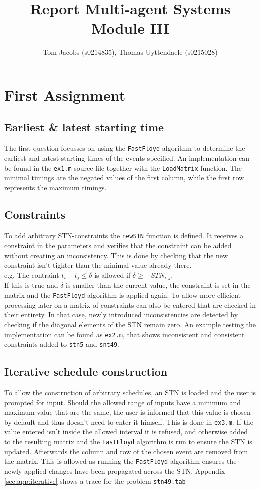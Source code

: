 \documentclass[10pt,a4paper]{article}
\title{Report Multi-agent Systems Module III}
\author{Tom Jacobs (s0214835), Thomas Uyttendaele (s0215028)}
\begin{document}
\maketitle
\tableofcontents

\section{First Assignment}
\subsection{Earliest \& latest starting time}
The first question focusses on using the \texttt{FastFloyd} algorithm to determine the earliest and latest starting times of the events specified. An implementation can be found in the \texttt{ex1.m} source file together with the \texttt{LoadMatrix} function. The minimal timings are the negated values of the first column, while the first row represents the maximum timings.

\subsection{Constraints}
\label{sec:constraints}
To add arbitrary STN-constraints the \texttt{newSTN} function is defined. It receives a constraint in the parameters and verifies that the constraint can be added without creating an inconsistency. This is done by checking that the new constraint isn't tighter than the minimal value already there. \\
e.g. The contraint $t_i - t_j \leq \delta$ is allowed if $\delta \geq -STN_{i,j}$.
\\If this is true and $\delta$ is smaller than the current value, the constraint is set in the matrix and the \texttt{FastFloyd} algorithm is applied again. To allow more efficient processing later on a matrix of constraints can also be entered that are checked in their entirety. In that case, newly introduced inconsistencies are detected by checking if the diagonal elements of the STN remain zero. An example testing the implementation can be found as \texttt{ex2.m}, that shows inconsistent and consistent constraints added to \texttt{stn5} and \texttt{snt49}.

\subsection{Iterative schedule construction}
\label{sec:iterative}
To allow the construction of arbitrary schedules, an STN is loaded and the user is prompted for input. Should the allowed range of inputs have a minimum and maximum value that are the same, the user is informed that this value is chosen by default and thus doesn't need to enter it himself. This is done in \texttt{ex3.m}. If the value entered isn't inside the allowed interval it is refused, and otherwise added to the resulting matrix and the \texttt{FastFloyd} algorithm is run to ensure the STN is updated. Afterwards the column and row of the chosen event are removed from the matrix. This is allowed as running the \texttt{FastFloyd} algorithm ensures the newly applied changes have been propagated across the STN. Appendix \ref{sec:app:iterative} shows a trace for the problem \texttt{stn49.tab}
\end{document}
